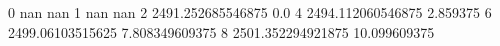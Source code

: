 0 nan nan
1 nan nan
2 2491.252685546875 0.0
4 2494.112060546875 2.859375
6 2499.06103515625 7.808349609375
8 2501.352294921875 10.099609375
